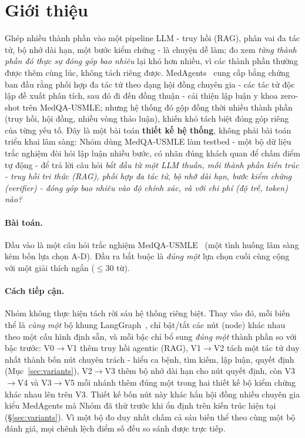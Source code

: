 \documentclass[11pt]{article}
\begin{document}
\section{Giới thiệu}
Ghép nhiều thành phần vào một pipeline LLM - truy hồi (RAG), phân vai đa tác tử, bộ nhớ dài hạn, một
bước kiểm chứng - là chuyện dễ làm; đo xem \emph{từng thành phần đó thực sự đóng góp bao nhiêu} lại khó
hơn nhiều, vì các thành phần thường được thêm cùng lúc, không tách riêng được. MedAgents~\cite{tang2024medagents}
cung cấp bằng chứng ban đầu rằng phối hợp đa tác tử theo dạng hội đồng chuyên gia - các tác tử độc lập
đề xuất phân tích, sau đó đi đến đồng thuận - cải thiện lập luận y khoa zero-shot trên MedQA-USMLE;
nhưng hệ thống đó gộp đồng thời nhiều thành phần (truy hồi, hội đồng, nhiều vòng thảo luận), khiến khó
tách biệt đóng góp riêng của từng yếu tố. Đây là một bài toán \textbf{thiết kế hệ thống}, không phải bài
toán triển khai lâm sàng: Nhóm dùng MedQA-USMLE làm testbed - một bộ dữ liệu trắc nghiệm đòi hỏi lập
luận nhiều bước, có nhãn đúng khách quan để chấm điểm tự động - để trả lời câu hỏi \emph{bắt đầu từ một
LLM thuần, mỗi thành phần kiến trúc - truy hồi tri thức (RAG), phối hợp đa tác tử, bộ nhớ dài hạn, bước
kiểm chứng (verifier) - đóng góp bao nhiêu vào độ chính xác, và với chi phí (độ trễ, token) nào?}

\paragraph{Bài toán.} Đầu vào là một câu hỏi trắc nghiệm MedQA-USMLE~\cite{jin2021medqa} (một tình huống lâm sàng kèm bốn
lựa chọn A-D). Đầu ra bắt buộc là \emph{đúng một} lựa chọn cuối cùng cộng với một giải thích ngắn
($\le 30$ từ).

\paragraph{Cách tiếp cận.} Nhóm không thực hiện tách rời sáu hệ thống riêng biệt. Thay vào đó, mỗi biến
thể là \emph{cùng một} bộ khung LangGraph~\cite{langgraph2024}, chỉ bật/tắt các nút (node) khác nhau
theo một cấu hình định sẵn, và mỗi bậc chỉ bổ sung \emph{đúng một} thành phần so với bậc trước: V0$\to$V1
thêm truy hồi agentic (RAG), V1$\to$V2 tách một tác tử duy nhất thành bốn nút chuyên trách - hiểu ca
bệnh, tìm kiếm, lập luận, quyết định (Mục~\ref{sec:variants}), V2$\to$V3 thêm bộ nhớ dài hạn cho nút
quyết định, còn V3$\to$V4 và V3$\to$V5 mỗi nhánh thêm đúng một trong hai thiết kế bộ kiểm chứng khác
nhau lên trên V3. Thiết kế bốn nút này khác hẳn hội đồng nhiều chuyên gia kiểu MedAgents mà Nhóm đã thử
trước khi ổn định trên kiến trúc hiện tại (\S\ref{sec:variants}). Vì một bộ đo duy nhất chấm cả sáu
biến thể theo cùng một bộ đánh giá, mọi chênh lệch điểm số đều so sánh được trực tiếp.
\end{document}

